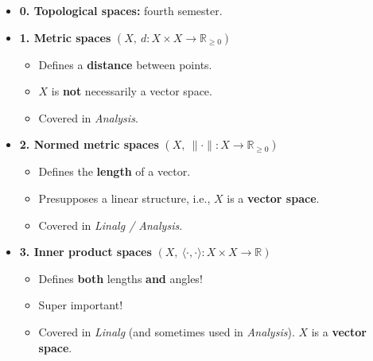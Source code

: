 \begin{itemize}
  \item \textbf{0. Topological spaces:} fourth semester.
  \item \textbf{1. Metric spaces} $(X,\ d : X \times X \to \mathbb{R}_{\geq 0})$
    \begin{itemize}
      \item Defines a \textbf{distance} between points.
      \item $X$ is \textbf{not} necessarily a vector space.
      \item Covered in \textit{Analysis}.
    \end{itemize}
  \item \textbf{2. Normed metric spaces} $(X,\ \|\cdot\| : X \to \mathbb{R}_{\geq 0})$
    \begin{itemize}
      \item Defines the \textbf{length} of a vector.
      \item Presupposes a linear structure, i.e., $X$ is a \textbf{vector space}.
      \item Covered in \textit{Linalg / Analysis}.
    \end{itemize}
  \item \textbf{3. Inner product spaces} $(X,\ \langle\cdot,\cdot\rangle : X \times X \to \mathbb{R})$
    \begin{itemize}
      \item Defines \textbf{both} lengths \textbf{and} angles!
      \item Super important!
      \item Covered in \textit{Linalg} (and sometimes used in \textit{Analysis}). $X$ is a \textbf{vector space}.
    \end{itemize}
\end{itemize}

\begin{center}
\end{center}

